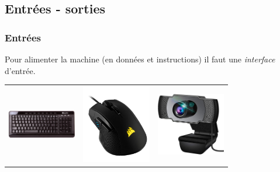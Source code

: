 \documentclass[svgnames,11pt]{beamer}
\begin{document}
\subsection{Entrées - sorties}
\begin{frame}
    \frametitle{Entrées}

    Pour alimenter la machine (en données et instructions) il faut une \emph{interface} d'entrée.
\begin{center}
    \begin{tabular}{ccc}
        \includegraphics[width=3cm]{ressources/clavier.jpg}&
        \includegraphics[width=3cm]{ressources/souris.jpg}&
        \includegraphics[width=3cm]{ressources/webcam.jpg}\\
    \end{tabular}
\end{center}

\end{frame}
\end{document}
